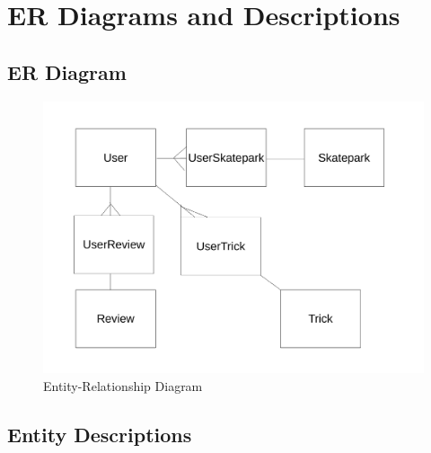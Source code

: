 \section{ER Diagrams and Descriptions}

\subsection{ER Diagram}


\begin{figure}[H]
    \includegraphics[width=\textwidth]{./Analysis/EntityRelationships.pdf}
    \caption{Entity-Relationship Diagram} \label{fig:Entity Diagram}
\end{figure}


\subsection{Entity Descriptions}

